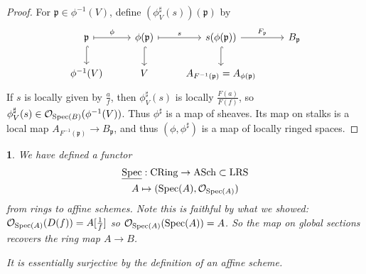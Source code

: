 \documentclass[12pt]{article}
\newtheorem{para}[theorem]{}
\begin{document}
\begin{proof}
	For $\mathfrak{p}\in\phi^{-1}(V)$, define $(\phi^\sharp_V(s))(\mathfrak{p})$ by 
	\begin{equation*}
\begin{tikzcd}
\mathfrak{p} \arrow[r, "\phi", maps to] \arrow[d, hook] & \phi(\mathfrak{p}) \arrow[r, "s", maps to] \arrow[d, hook] & s(\phi(\mathfrak{p})) \arrow[r, "F_\mathfrak{p}"] \arrow[d, hook] & B_\mathfrak{p} \\
\phi^{-1}(V)                                            & V                                                          & A_{F^{-1}(\mathfrak{p})}=A_{\phi(\mathfrak{p})}                   &               
\end{tikzcd}
	\end{equation*}
	If $s$ is locally given by $\frac{a}{f}$, then $\phi^\sharp_V(s)$ is locally $\frac{F(a)}{F(f)}$, so $\phi^\sharp_V(s)\in\mathcal{O}_{\text{Spec}(B)}(\phi^{-1}(V))$. Thus $\phi^\sharp$ is a map of sheaves. Its map on stalks is a local map $A_{F^{-1}(\mathfrak{p})}\to B_\mathfrak{p}$, and thus $(\phi,\phi^\sharp)$ is a map of locally ringed spaces.
\end{proof}

\begin{para}
	We have defined a functor 
	\begin{gather*}
		\underline{\text{Spec}}: \text{CRing} \to \text{ASch}\subset \text{LRS} \\
		A \mapsto (\text{Spec}(A), \mathcal{O}_{\text{Spec}(A)})
	\end{gather*}
	from rings to affine schemes. Note this is faithful by what we showed: $\mathcal{O}_{\text{Spec}(A)}(D(f))=A[\frac{1}{f}]$ so $\mathcal{O}_{\text{Spec}(A)}(\text{Spec}(A)) = A$. So the map on global sections recovers the ring map $A\to B$.

	It is essentially surjective by the definition of an affine scheme.
\end{para}
\end{document}
